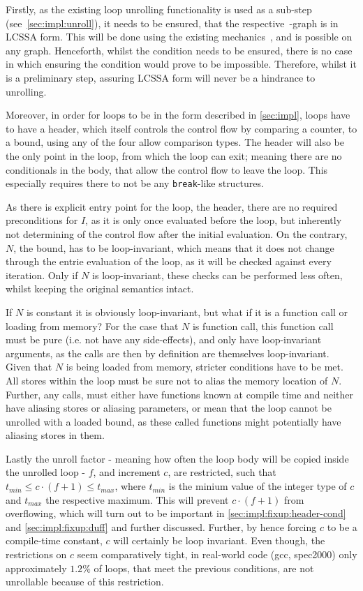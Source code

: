 Firstly, as the existing loop unrolling functionality is used as a sub-step (see~\cref{sec:impl:unroll}), it needs to be ensured, that the respective~\libFIRM-graph is in LCSSA form.
This will be done using the existing mechanics~\cite{aebi18bachelorarbeit}, and is possible on any graph.
Henceforth, whilst the condition needs to be ensured, there is no case in which ensuring the condition would prove to be impossible.
Therefore, whilst it is a preliminary step, assuring LCSSA form will never be a hindrance to unrolling.

Moreover, in order for loops to be in the form described in \cref{sec:impl}, loops have to have a header, which itself controls the control flow by comparing a counter, to a bound, using any of the four allow comparison types.
The header will also be the only point in the loop, from which the loop can exit; meaning there are no conditionals in the body, that allow the control flow to leave the loop.
This especially requires there to not be any \texttt{break}-like structures.

As there is explicit entry point for the loop, the header, there are no required preconditions for $I$, as it is only once evaluated before the loop, but inherently not determining of the control flow after the initial evaluation.
On the contrary, $N$, the bound, has to be loop-invariant, which means that it does not change through the entrie evaluation of the loop, as it will be checked against every iteration.
Only if $N$ is loop-invariant, these checks can be performed less often, whilst keeping the original semantics intact.

If $N$ is constant it is obviously loop-invariant, but what if it is a function call or loading from memory?
For the case that $N$ is function call, this function call must be pure (i.e. not have any side-effects), and only have loop-invariant arguments, as the calls are then by definition are themselves loop-invariant.
Given that $N$ is being loaded from memory, stricter conditions have to be met.
All stores within the loop must be sure not to alias the memory location of $N$.
Further, any calls, must either have functions known at compile time and neither have aliasing stores or aliasing parameters, or mean that the loop cannot be unrolled with a loaded bound, as these called functions might potentially have aliasing stores in them.

Lastly the unroll factor - meaning how often the loop body will be copied inside the unrolled loop - $f$, and increment $c$, are restricted, such that $t_{min} \leq c \cdot (f+1) \leq t_{max}$, where $t_{min}$ is the minium value of the integer type of $c$ and $t_{max}$ the respective maximum.
This will prevent $c \cdot (f + 1)$ from overflowing, which will turn out to be important in \cref{sec:impl:fixup:header-cond} and \cref{sec:impl:fixup:duff} and further discussed.
Further, by hence forcing $c$ to be a compile-time constant, $c$ will certainly be loop invariant.
Even though, the restrictions on $c$ seem comparatively tight, in real-world code (gcc, spec2000) only approximately $1.2\%$ of loops, that meet the previous conditions, are not unrollable because of this restriction.


